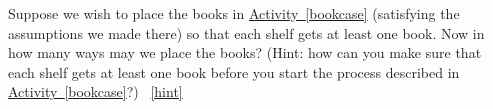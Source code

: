\documentclass{book}
\begin{document}
\setcounter{project}{126}
\addtocounter{project}{-1}
\begin{activity}[]\label{bookcaseeveryshelf}
\hypertarget{p-896}{}%
Suppose we wish to place the books in \hyperref[bookcase]{Activity~\ref{bookcase}} (satisfying the assumptions we made there) so that each shelf gets at least one book. Now in how many ways may we place the books? (Hint: how can you make sure that each shelf gets at least one book before you start the process described in \hyperref[bookcase]{Activity~\ref{bookcase}}?)%
~\hfill{\tiny\hyperlink{a-126}{[hint]}\hypertarget{q-126}{}}\end{activity}
\end{document}
